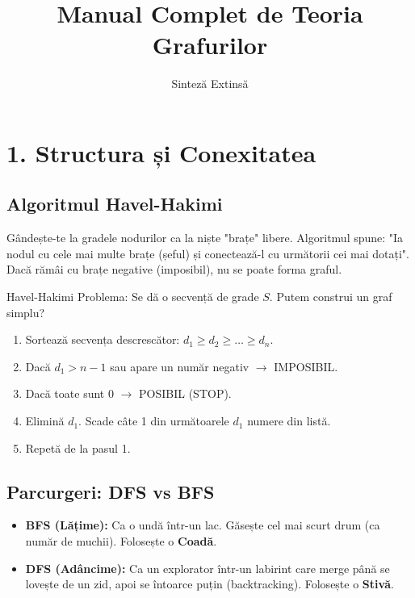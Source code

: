 \documentclass[a4paper,10pt]{article}
\title{\textbf{Manual Complet de Teoria Grafurilor}}
\author{Sinteză Extinsă}
\date{}
\begin{document}
\maketitle
\tableofcontents
\newpage

\section{1. Structura și Conexitatea}

\subsection{Algoritmul Havel-Hakimi}

\begin{intuition}
Gândește-te la gradele nodurilor ca la niște "brațe" libere. Algoritmul spune: "Ia nodul cu cele mai multe brațe (șeful) și conectează-l cu următorii cei mai dotați". Dacă rămâi cu brațe negative (imposibil), nu se poate forma graful.
\end{intuition}

\begin{algorithmbox}{Havel-Hakimi}
Problema: Se dă o secvență de grade $S$. Putem construi un graf simplu?
\begin{enumerate}
    \item Sortează secvența descrescător: $d_1 \ge d_2 \ge \dots \ge d_n$.
    \item Dacă $d_1 > n-1$ sau apare un număr negativ $\to$ IMPOSIBIL.
    \item Dacă toate sunt $0$ $\to$ POSIBIL (STOP).
    \item Elimină $d_1$. Scade câte 1 din următoarele $d_1$ numere din listă.
    \item Repetă de la pasul 1.
\end{enumerate}
\end{algorithmbox}

\subsection{Parcurgeri: DFS vs BFS}
\begin{itemize}
    \item \textbf{BFS (Lățime):} Ca o undă într-un lac. Găsește cel mai scurt drum (ca număr de muchii). Folosește o \textbf{Coadă}.
    \item \textbf{DFS (Adâncime):} Ca un explorator într-un labirint care merge până se lovește de un zid, apoi se întoarce puțin (backtracking). Folosește o \textbf{Stivă}.
\end{itemize}
\end{document}
